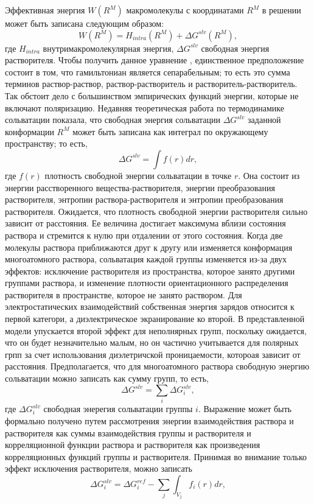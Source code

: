 Эффективная энергия $W(R^M)$ макромолекулы с координатами $R^M$ в решении может быть записана следующим образом:
\[W(R^M) = H_{intra}(R^M) + \Delta G^{slv}(R^M),\]
где $H_{intra}$ внутримакромолекулярная энергия, $\Delta G^{slv}$ свободная энергия растворителя. Чтобы получить данное уравнение , единственное предположение состоит в том, что гамильтониан является сепарабельным; то есть это сумма терминов раствор-раствор, раствор-растворитель и растворитель-растворитель. Так обстоит дело с большинством эмпирических функций энергии, которые не включают поляризацию. Недавняя теоретическая работа по термодинамике сольватации показала, что свободная энергия сольватации $\Delta G^{slv}$ заданной конформации $R^M$ может быть записана как интеграл по окружающему пространству; то есть,
\[\Delta G^{slv} = \int f(r)dr,\]
где $f(r)$ плотность свободной энергии сольватации в точке $r$. Она состоит из энергии расстворенного вещества-растворителя, энергии преобразования растворителя, энтропии раствора-растворителя и энтропии преобразования растворителя. Ожидается, что плотность свободной энергии растворителя сильно зависит от расстояния. Ее величина достигает максимума вблизи состояния раствора и стремится к нулю при отдалении от этого состояния. Когда две молекулы раствора приближаются друг к другу или изменяется конформация многоатомного раствора, сольватация каждой группы изменяется из-за двух эффектов: исключение растворителя из пространства, которое занято другими группами раствора, и изменение плотности ориентационного распределения растворителя в пространстве, которое не занято раствором. Для электростатических взаимодействий собственная энергия зарядов относится к первой категори, а диэлектрическое экранирование ко второй. В представленной модели упускается второй эффект для неполнярных групп, поскольку ожидается, что он будет незначительно малым, но он частично учитывается для полярных грпп за счет использования диэлетричской проницаемости, котороая зависит от расстояния. Предполагается, что для многоатомного раствора свободную энергию сольватации можно записать как сумму групп, то есть,
\[\Delta G^{slv} = \sum_i \Delta G_i^{slv},\]
где $\Delta G_i^{slv}$ свободная энерегия сольватации группы $i$. Выражение может быть формально получено путем рассмотрения энергии взаимодействия раствора и растворителя как суммы взаимодействия группы и растворителя и корреляционной функции раствора и растворителя как произведения корреляционных функций группы и растворителя. Принимая во внимание только эффект исключения растворителя, можно записать 
\[\Delta G_i^{slv} = \Delta G_i^{ref} - \sum_j \int_{V_j} f_i(r) dr,\]
